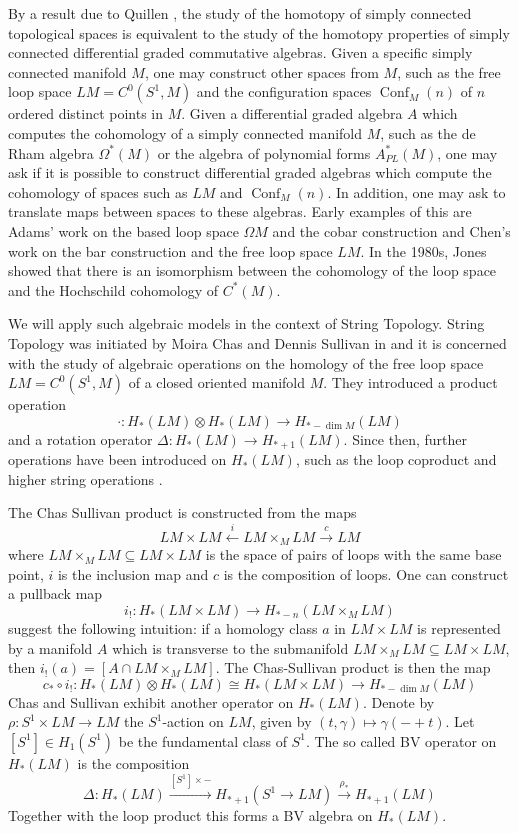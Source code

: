 \documentclass{scrartcl}
\theoremstyle{plain}
\theoremstyle{definition}
\renewcommand{\subset}{\subseteq}
\newcommand{\isect}{\mathbin{\cap}}
\newcommand{\APL}{A_{PL}}
\newcommand{\iso}{\cong}
\let\xto\xrightarrow
\let\xfrom\xleftarrow
\DeclareMathOperator{\Conf}{Conf}
\newcommand{\blank}{-}
\newcommand{\comp}{\mathbin{\circ}}
\begin{document}
By a result due to Quillen \cite{quillen1969rational}, the study of the homotopy of simply connected topological spaces is equivalent to the study of the homotopy properties of simply connected differential graded commutative algebras. Given a specific simply connected manifold $M$, one may construct other spaces from $M$, such as the free loop space $LM = C^0(S^1, M)$ and the configuration spaces $\Conf_M(n)$ of $n$ ordered distinct points in $M$. Given a differential graded algebra $A$ which computes the cohomology of a simply connected manifold $M$, such as the de Rham algebra $\Omega^*(M)$ or the algebra of polynomial forms $\APL^*(M)$, one may ask if it is possible to construct differential graded algebras which compute the cohomology of spaces such as $LM$ and $\Conf_M(n)$. In addition, one may ask to translate maps between spaces to these algebras. Early examples of this are Adams' work on the based loop space $\Omega M$ and the cobar construction \cite{adams1956cobar} and Chen's work \cite{chen1977iterated} on the bar construction and the free loop space $LM$. In the 1980s, Jones showed that there is an isomorphism between the cohomology of the loop space and the Hochschild cohomology of $C^*(M)$. 

We will apply such algebraic models in the context of String Topology. String Topology was initiated by Moira Chas and Dennis Sullivan in \cite{chas1999string} and it is concerned with the study of algebraic operations on the homology of the free loop space $LM=C^0(S^1, M)$ of a closed oriented manifold $M$. They introduced a product operation $$\cdot\colon H_*(LM)\otimes H_*(LM)\to H_{*-\dim M}(LM)$$ and a rotation operator $\Delta\colon H_*(LM)\to H_{*+1}(LM)$. Since then, further operations have been introduced on $H_*(LM)$, such as the loop coproduct \cite{Goresky_2009} and higher string operations \cite{godin2007higher}.

The Chas Sullivan product is constructed from the maps $$LM\times LM \xfrom{i} LM\times_M LM \xto{c} LM$$
where $LM\times_M LM\subset LM\times LM$ is the space of pairs of loops with the same base point, $i$ is the inclusion map and $c$ is the composition of loops. One can construct a pullback map $$i_!\colon H_*(LM\times LM)\to H_{*-n}(LM\times_M LM)$$
\cite{chas1999string} suggest the following intuition: if a homology class $a$ in $LM\times LM$ is represented by a manifold $A$ which is transverse to the submanifold $LM\times_M LM\subset LM\times LM$, then $i_!(a) = [A\isect LM\times_M LM]$. The Chas-Sullivan product is then the map $$c_*\comp i_!\colon H_*(LM)\otimes H_*(LM)\iso H_*(LM\times LM)\to H_{*-\dim M}(LM)$$
Chas and Sullivan exhibit another operator on $H_*(LM)$. Denote by $\rho\colon S^1\times LM\to LM$ the $S^1$-action on $LM$, given by $(t,\gamma)\mapsto \gamma(\blank+t)$. Let $[S^1]\in H_1(S^1)$ be the fundamental class of $S^1$. The so called BV operator on $H_*(LM)$ is the composition 
$$\Delta\colon H_*(LM)\xto{[S^1]\times \blank} H_{*+1}(S^{1}\to LM)\xto{\rho_*} H_{*+1}(LM)$$
Together with the loop product this forms a BV algebra on $H_*(LM)$. 
\end{document}
